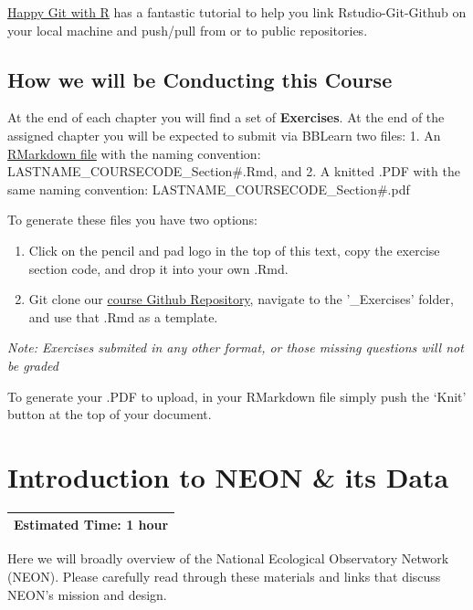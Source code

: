 \documentclass[]{book}
\providecommand{\tightlist}{%
  \setlength{\itemsep}{0pt}\setlength{\parskip}{0pt}}
\begin{document}
\href{https://happygitwithr.com/rstudio-git-github.html}{Happy Git with R} has a fantastic tutorial to help you link Rstudio-Git-Github on your local machine and push/pull from or to public repositories.

\hypertarget{how-we-will-be-conducting-this-course}{%
\section{How we will be Conducting this Course}\label{how-we-will-be-conducting-this-course}}

At the end of each chapter you will find a set of \textbf{Exercises}. At the end of the assigned chapter you will be expected to submit via BBLearn two files:
1. An \href{https://rstudio.com/wp-content/uploads/2015/02/rmarkdown-cheatsheet.pdf}{RMarkdown file} with the naming convention:
LASTNAME\_COURSECODE\_Section\#.Rmd, and
2. A knitted .PDF with the same naming convention:
LASTNAME\_COURSECODE\_Section\#.pdf

To generate these files you have two options:

\begin{enumerate}
\def\labelenumi{\arabic{enumi}.}
\tightlist
\item
  Click on the pencil and pad logo in the top of this text, copy the exercise section code, and drop it into your own .Rmd.
\item
  Git clone our \href{https://github.com/katharynduffy/katharynduffy.github.io}{course Github Repository}, navigate to the '\_Exercises' folder, and use that .Rmd as a template.
\end{enumerate}

\emph{Note: Exercises submited in any other format, or those missing questions will not be graded}

To generate your .PDF to upload, in your RMarkdown file simply push the `Knit' button at the top of your document.

\hypertarget{introduction-to-neon-its-data}{%
\chapter{Introduction to NEON \& its Data}\label{introduction-to-neon-its-data}}

\begin{longtable}[]{@{}l@{}}
\toprule
\endhead
Estimated Time: 1 hour\tabularnewline
\bottomrule
\end{longtable}

Here we will broadly overview of the National Ecological Observatory
Network (NEON). Please carefully read through these materials and links that
discuss NEON's mission and design.
\end{document}
